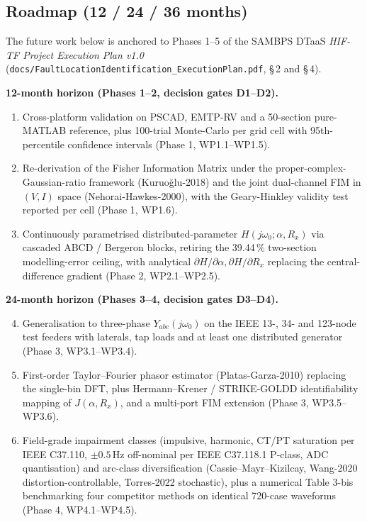 \documentclass[journal]{IEEEtran}
\begin{document}
\subsection{Roadmap (12 / 24 / 36 months)}
The future work below is anchored to Phases 1--5 of the SAMBPS DTaaS
\emph{HIF-TF Project Execution Plan v1.0}
(\texttt{docs/FaultLocationIdentification\_ExecutionPlan.pdf},
\S\,2 and \S\,4).

\noindent\textbf{12-month horizon (Phases 1--2, decision gates D1--D2).}
\begin{enumerate}
  \item Cross-platform validation on PSCAD, EMTP-RV and a 50-section
        pure-MATLAB reference, plus 100-trial Monte-Carlo per grid
        cell with 95th-percentile confidence intervals
        (Phase 1, WP1.1--WP1.5).
  \item Re-derivation of the Fisher Information Matrix under the
        proper-complex-Gaussian-ratio framework
        (Kuruo\u{g}lu-2018) and the joint dual-channel FIM
        in $(V,I)$ space (Nehorai-Hawkes-2000), with the
        Geary-Hinkley validity test reported per cell
        (Phase 1, WP1.6).
  \item Continuously parametrised distributed-parameter $H(j\omega_0;
        \alpha, R_x)$ via cascaded ABCD / Bergeron blocks, retiring
        the 39.44\,\% two-section modelling-error ceiling, with
        analytical $\partial H/\partial\alpha,\partial H/\partial R_x$
        replacing the central-difference gradient
        (Phase 2, WP2.1--WP2.5).
\end{enumerate}

\noindent\textbf{24-month horizon (Phases 3--4, decision gates D3--D4).}
\begin{enumerate}\setcounter{enumi}{3}
  \item Generalisation to three-phase $Y_{abc}(j\omega_0)$ on the IEEE
        13-, 34- and 123-node test feeders with laterals, tap loads
        and at least one distributed generator
        (Phase 3, WP3.1--WP3.4).
  \item First-order Taylor--Fourier phasor estimator
        (Platas-Garza-2010) replacing the single-bin DFT, plus
        Hermann--Krener / STRIKE-GOLDD identifiability mapping of
        $J(\alpha, R_x)$, and a multi-port FIM extension
        (Phase 3, WP3.5--WP3.6).
  \item Field-grade impairment classes (impulsive, harmonic,
        CT/PT saturation per IEEE C37.110, $\pm 0.5$\,Hz off-nominal
        per IEEE C37.118.1 P-class, ADC quantisation) and arc-class
        diversification (Cassie--Mayr--Kizilcay, Wang-2020
        distortion-controllable, Torres-2022 stochastic), plus a
        numerical Table 3-bis benchmarking four competitor methods
        on identical 720-case waveforms
        (Phase 4, WP4.1--WP4.5).
\end{enumerate}
\end{document}
